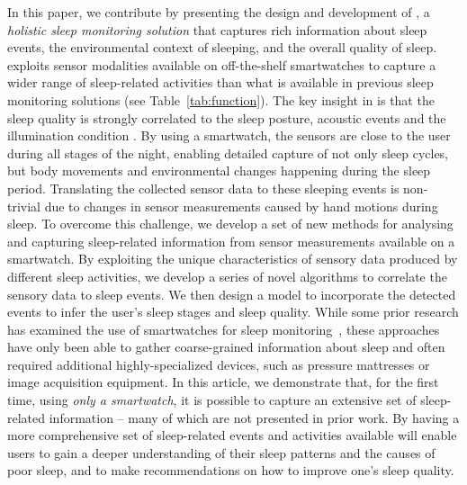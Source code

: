 In this paper, we contribute by presenting the design and development of \systemname, a \emph{holistic sleep monitoring solution} that captures rich information about sleep events, the environmental context of sleeping, and the overall quality of sleep. \systemname exploits sensor modalities available on off-the-shelf smartwatches to capture a wider range of sleep-related activities than what is available in previous sleep monitoring solutions (see Table~\ref{tab:function}). The key insight
in {\systemname} is that the sleep quality is strongly correlated to the sleep posture, acoustic events and the illumination condition
\cite{shelgikar2016sleep}. By using a smartwatch,
the sensors are close to the user during all stages of the night, enabling detailed capture of not only sleep cycles, but body movements and environmental changes happening during the sleep period. Translating the collected sensor data to these sleeping events is non-trivial due to changes in sensor measurements caused by hand motions during sleep. To overcome this challenge, we develop a set of new methods for analysing and capturing sleep-related information from sensor measurements available on a smartwatch. By exploiting the unique characteristics of sensory data produced by different sleep activities, we develop a
series of novel algorithms to correlate the sensory data to sleep events. We then design a model to incorporate the detected events to
infer the user's sleep stages and sleep quality. While some prior research has examined the use of smartwatches for sleep monitoring~\cite{pombo2016ubisleep,shelgikar2016sleep,haescher2015anomaly,borazio2012combining}, these approaches have only been able to gather coarse-grained information about sleep and often required additional highly-specialized devices, such as pressure mattresses or image acquisition equipment. In this article, we demonstrate that, for the first time, using {\em only a smartwatch}, it is possible to capture an extensive set of sleep-related information -- many of
which are not presented in prior work. By having a more comprehensive set of sleep-related events and activities available will enable users to gain a deeper understanding of their sleep patterns and the causes of poor sleep, and to make recommendations on how to improve one's sleep quality. 




